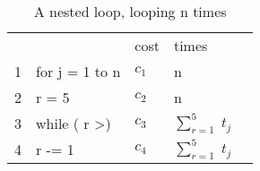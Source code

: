 \begin{center}
	\begin{table}[h]
		\centering
		\begin{tabular}{lllll}
			& & cost & times                     &  \\
			1 & for j = 1 to n            & $c_1$ & n                     &  \\
			2 & r = 5  & $c_2$ & n                     &  \\
			3 & while ( r \textgreater\;0) & $c_3$ & $\sum_{r=1}^{5}\;t_j$ &  \\
			4 & r -= 1                    & $c_4$ & $\sum_{r=1}^{5}\;t_j$ & 
		\end{tabular}
		\caption{A nested loop, looping n times}
		\label{tab:simpleCode}
	\end{table}
\end{center}